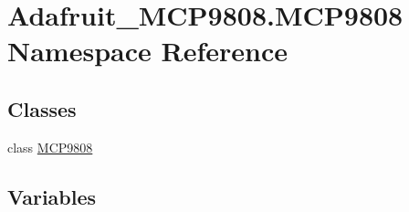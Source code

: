 \hypertarget{namespaceAdafruit__MCP9808_1_1MCP9808}{}\section{Adafruit\+\_\+\+M\+C\+P9808.\+M\+C\+P9808 Namespace Reference}
\label{namespaceAdafruit__MCP9808_1_1MCP9808}
\subsection*{Classes}
\begin{DoxyCompactItemize}
\item 
class \hyperlink{classAdafruit__MCP9808_1_1MCP9808_1_1MCP9808}{M\+C\+P9808}
\end{DoxyCompactItemize}
\subsection*{Variables}
